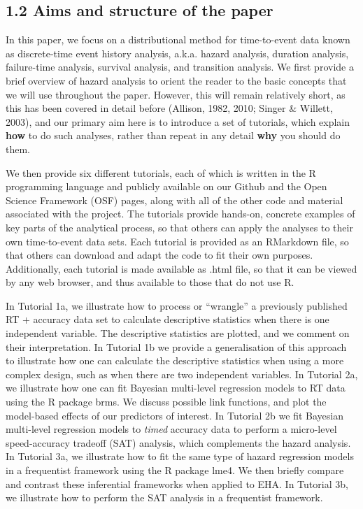 \documentclass[
  man,floatsintext]{apa6}
\begin{document}
\subsection{1.2 Aims and structure of the paper}\label{aims-and-structure-of-the-paper}

In this paper, we focus on a distributional method for time-to-event data known as discrete-time event history analysis, a.k.a. hazard analysis, duration analysis, failure-time analysis, survival analysis, and transition analysis.
We first provide a brief overview of hazard analysis to orient the reader to the basic concepts that we will use throughout the paper. However, this will remain relatively short, as this has been covered in detail before (Allison, 1982, 2010; Singer \& Willett, 2003), and our primary aim here is to introduce a set of tutorials, which explain \textbf{how} to do such analyses, rather than repeat in any detail \textbf{why} you should do them.

We then provide six different tutorials, each of which is written in the R programming language and publicly available on our Github and the Open Science Framework (OSF) pages, along with all of the other code and material associated with the project. The tutorials provide hands-on, concrete examples of key parts of the analytical process, so that others can apply the analyses to their own time-to-event data sets. Each tutorial is provided as an RMarkdown file, so that others can download and adapt the code to fit their own purposes. Additionally, each tutorial is made available as .html file, so that it can be viewed by any web browser, and thus available to those that do not use R.

In Tutorial 1a, we illustrate how to process or ``wrangle'' a previously published RT + accuracy data set to calculate descriptive statistics when there is one independent variable. The descriptive statistics are plotted, and we comment on their interpretation. In Tutorial 1b we provide a generalisation of this approach to illustrate how one can calculate the descriptive statistics when using a more complex design, such as when there are two independent variables. In Tutorial 2a, we illustrate how one can fit Bayesian multi-level regression models to RT data using the R package brms. We discuss possible link functions, and plot the model-based effects of our predictors of interest. In Tutorial 2b we fit Bayesian multi-level regression models to \emph{timed} accuracy data to perform a micro-level speed-accuracy tradeoff (SAT) analysis, which complements the hazard analysis. In Tutorial 3a, we illustrate how to fit the same type of hazard regression models in a frequentist framework using the R package lme4. We then briefly compare and contrast these inferential frameworks when applied to EHA. In Tutorial 3b, we illustrate how to perform the SAT analysis in a frequentist framework.
\end{document}
